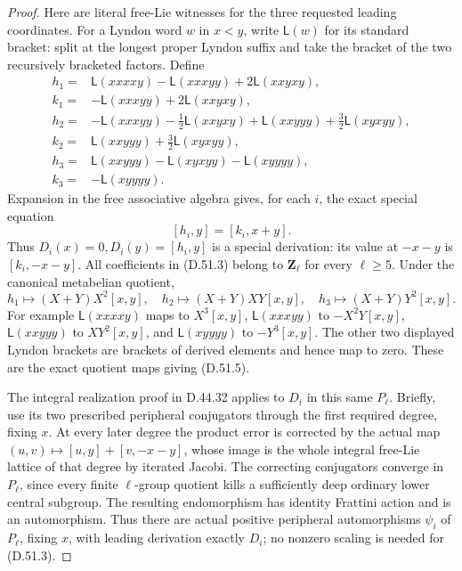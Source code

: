 \begin{proof}
Here are literal free-Lie witnesses for the three requested
leading coordinates. For a Lyndon word \(w\) in \(x<y\),
write \(\mathsf L(w)\) for its standard bracket: split at
the longest proper Lyndon suffix and take the bracket of
the two recursively bracketed factors. Define
\[
 \begin{aligned}
 h_1={}&\mathsf L(xxxxy)-\mathsf L(xxxyy)+2\mathsf L(xxyxy),\\
 k_1={}&-\mathsf L(xxxyy)+2\mathsf L(xxyxy),\\[2pt]
 h_2={}&-\mathsf L(xxxyy)-\tfrac12\mathsf L(xxyxy)
             +\mathsf L(xxyyy)+\tfrac32\mathsf L(xyxyy),\\
 k_2={}&\mathsf L(xxyyy)+\tfrac32\mathsf L(xyxyy),\\[2pt]
 h_3={}&\mathsf L(xxyyy)-\mathsf L(xyxyy)-\mathsf L(xyyyy),\\
 k_3={}&-\mathsf L(xyyyy).
 \end{aligned}
 \tag{D.51.3}
\]
Expansion in the free associative algebra gives, for each
\(i\), the exact special equation
\[
                         [h_i,y]=[k_i,x+y].
 \tag{D.51.4}
\]
Thus \(D_i(x)=0,D_i(y)=[h_i,y]\) is a special derivation:
its value at \(-x-y\) is \([k_i,-x-y]\).
All coefficients in \textup{(D.51.3)} belong to
\(\mathbf Z_\ell\) for every \(\ell\geq5\).
Under the canonical metabelian quotient,
\[
 h_1\longmapsto(X+Y)X^2[x,y],\quad
 h_2\longmapsto(X+Y)XY[x,y],\quad
 h_3\longmapsto(X+Y)Y^2[x,y].
 \tag{D.51.5}
\]
For example \(\mathsf L(xxxxy)\) maps to \(X^3[x,y]\),
\(\mathsf L(xxxyy)\) to \(-X^2Y[x,y]\),
\(\mathsf L(xxyyy)\) to \(XY^2[x,y]\), and
\(\mathsf L(xyyyy)\) to \(-Y^3[x,y]\).
The other two displayed Lyndon brackets are brackets
of derived elements and hence map to zero. These are
the exact quotient maps giving \textup{(D.51.5)}.

The integral realization proof in D.44.32 applies to
\(D_i\) in this same \(P_\ell\). Briefly, use its
two prescribed peripheral conjugators through the first
required degree, fixing \(x\). At every later degree
the product error is corrected by the actual map
\((u,v)\mapsto[u,y]+[v,-x-y]\), whose image is the
whole integral free-Lie lattice of that degree by
iterated Jacobi. The correcting conjugators converge
in \(P_\ell\), since every finite \(\ell\)-group
quotient kills a sufficiently deep ordinary lower
central subgroup. The resulting endomorphism has
identity Frattini action and is an automorphism.
Thus there are actual positive peripheral automorphisms
\(\psi_i\) of \(P_\ell\), fixing \(x\), with leading
derivation exactly \(D_i\); no nonzero scaling is
needed for \textup{(D.51.3)}.


\end{proof}
